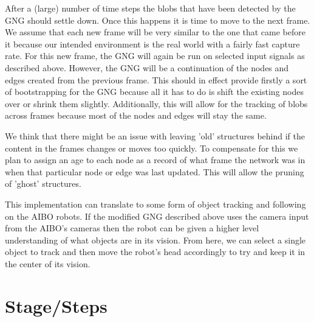 \documentclass{article}
\begin{document}
After a (large) number of time steps the blobs that have been detected by the GNG should settle down. Once this happens it is time to move to the next frame. We assume that each new frame will be very similar to the one that came before it because our intended environment is the real world with a fairly fast capture rate. For this new frame, the GNG will again be run on selected input signals as described above. However, the GNG will be a continuation of the nodes and edges created from the previous frame. This should in effect provide firstly a sort of bootstrapping for the GNG because all it has to do is shift the existing nodes over or shrink them slightly. Additionally, this will allow for the tracking of blobs across frames because most of the nodes and edges will stay the same. 

We think that there might be an issue with leaving 'old' structures behind if the content in the frames changes or moves too quickly. To compensate for this we plan to assign an age to each node as a record of what frame the network was in when that particular node or edge was last updated. This will allow the pruning of 'ghost' structures.

This implementation can translate to some form of object tracking and following on the AIBO robots. If the modified GNG described above uses the camera input from the AIBO's cameras then the robot can be given a higher level understanding of what objects are in its vision. From here, we can select a single object to track and then move the robot's head accordingly to try and keep it in the center of its vision.

\section{Stage/Steps}
\end{document}
